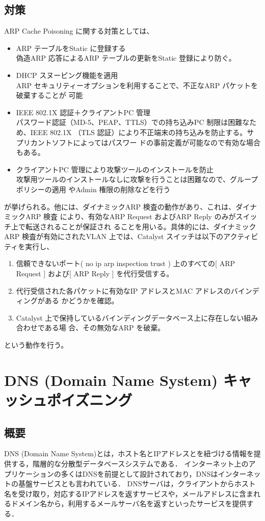 \subsection{対策}
ARP Cache Poisoning に関する対策としては、
\begin{itemize}
\item ARP テーブルをStatic に登録する\\
偽造ARP 応答によるARP テーブルの更新をStatic 登録により防ぐ。
\item DHCP スヌーピング機能を適用\\
ARP セキュリティーオプションを利用することで、不正なARP パケットを破棄することが
可能
\item IEEE 802.1X 認証＋クライアントPC 管理\\
パスワード認証（MD-5、PEAP、TTLS）での持ち込みPC 制限は困難なため、IEEE 802.1X
（TLS 認証）により不正端末の持ち込みを防止する。サプリカントソフトによってはパスワー
ドの事前定義が可能なので有効な場合もある。
\item クライアントPC 管理により攻撃ツールのインストールを防止\\
攻撃用ツールのインストールなしに攻撃を行うことは困難なので、グループポリシーの適用
やAdmin 権限の削除などを行う
\end{itemize}
が挙げられる。\cite{arp-taisaku}他には、ダイナミックARP 検査の動作があり、これは、ダイナミックARP 検査
により、有効なARP Request およびARP Reply のみがスイッチ上で転送されることが保証され
ることを用いる。具体的には、ダイナミックARP 検査が有効にされたVLAN 上では、Catalyst
スイッチは以下のアクティビティを実行し、
\begin{enumerate}
\item 信頼できないポート( no ip arp inspection trust ) 上のすべての[ ARP Request ] および[
ARP Reply ] を代行受信する。
\item 代行受信された各パケットに有効なIP アドレスとMAC アドレスのバインディングがある
かどうかを確認。
\item Catalyst 上で保持しているバインディングデータベース上に存在しない組み合わせである場
合、その無効なARP を破棄。
\end{enumerate}
という動作を行う。

\section{DNS (Domain Name System) キャッシュポイズニング}
\subsection{概要}
DNS (Domain Name System)とは，ホスト名とIPアドレスとを紐づける情報を提供する，階層的な分散型データベースシステムである．
インターネット上のアプリケーションの多くはDNSを前提として設計されており，DNSはインターネットの基盤サービスとも言われている．
DNSサーバは，クライアントからホスト名を受け取り，対応するIPアドレスを返すサービスや，メールアドレスに含まれるドメイン名から，利用するメールサーバ名を返すといったサービスを提供する．


